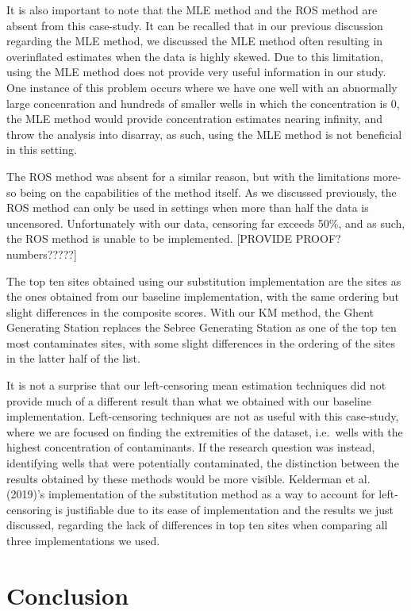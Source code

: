 \documentclass[12pt, twoside]{amherstthesis}
\begin{document}
It is also important to note that the MLE method and the ROS method are absent from this case-study. It can be recalled that in our previous discussion regarding the MLE method, we discussed the MLE method often resulting in overinflated estimates when the data is highly skewed. Due to this limitation, using the MLE method does not provide very useful information in our study. One instance of this problem occurs where we have one well with an abnormally large concenration and hundreds of smaller wells in which the concentration is 0, the MLE method would provide concentration estimates nearing infinity, and throw the analysis into disarray, as such, using the MLE method is not beneficial in this setting.

The ROS method was absent for a similar reason, but with the limitations more-so being on the capabilities of the method itself. As we discussed previously, the ROS method can only be used in settings when more than half the data is uncensored. Unfortunately with our data, censoring far exceeds 50\%, and as such, the ROS method is unable to be implemented. {[}PROVIDE PROOF? numbers?????{]}

The top ten sites obtained using our substitution implementation are the sites as the ones obtained from our baseline implementation, with the same ordering but slight differences in the composite scores. With our KM method, the Ghent Generating Station replaces the Sebree Generating Station as one of the top ten most contaminates sites, with some slight differences in the ordering of the sites in the latter half of the list.

It is not a surprise that our left-censoring mean estimation techniques did not provide much of a different result than what we obtained with our baseline implementation. Left-censoring techniques are not as useful with this case-study, where we are focused on finding the extremities of the dataset, i.e.~wells with the highest concentration of contaminants. If the research question was instead, identifying wells that were potentially contaminated, the distinction between the results obtained by these methods would be more visible. Kelderman et al. (2019)'s implementation of the substitution method as a way to account for left-censoring is justifiable due to its ease of implementation and the results we just discussed, regarding the lack of differences in top ten sites when comparing all three implementations we used.

\hypertarget{conclusion}{%
\chapter{Conclusion}\label{conclusion}}
\end{document}

